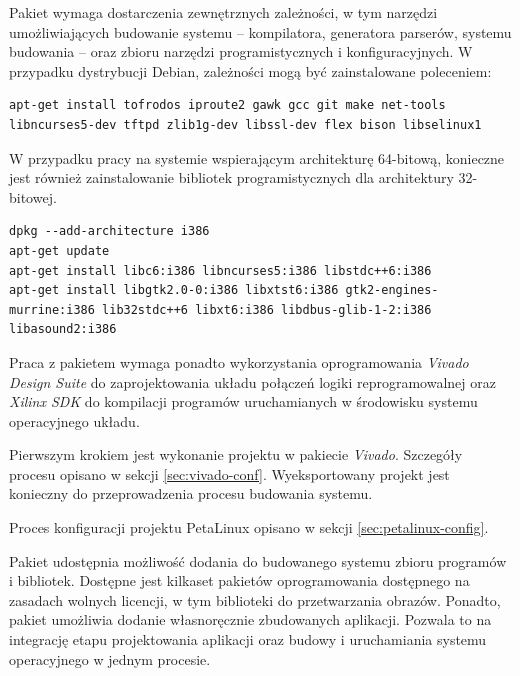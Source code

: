 Pakiet wymaga dostarczenia zewnętrznych zależności, w tym narzędzi umożliwiających budowanie systemu -- kompilatora, generatora parserów, systemu budowania -- oraz zbioru narzędzi programistycznych i konfiguracyjnych.
W przypadku dystrybucji Debian, zależności mogą być zainstalowane poleceniem:

\begin{lstlisting}[breaklines=true]
apt-get install tofrodos iproute2 gawk gcc git make net-tools libncurses5-dev tftpd zlib1g-dev libssl-dev flex bison libselinux1
\end{lstlisting}

W przypadku pracy na systemie wspierającym architekturę 64-bitową, konieczne jest również zainstalowanie bibliotek programistycznych dla architektury 32-bitowej.

\begin{lstlisting}[breaklines=true]
dpkg --add-architecture i386
apt-get update
apt-get install libc6:i386 libncurses5:i386 libstdc++6:i386
apt-get install libgtk2.0-0:i386 libxtst6:i386 gtk2-engines-murrine:i386 lib32stdc++6 libxt6:i386 libdbus-glib-1-2:i386 libasound2:i386
\end{lstlisting}

Praca z pakietem wymaga ponadto wykorzystania oprogramowania \emph{Vivado Design Suite} \cite{vivado-home} do zaprojektowania układu połączeń logiki reprogramowalnej oraz \emph{Xilinx SDK} \cite{xsdk-home} do kompilacji programów uruchamianych w środowisku systemu operacyjnego układu.

Pierwszym krokiem jest wykonanie projektu w pakiecie \emph{Vivado}. 
Szczegóły procesu opisano w sekcji \ref{sec:vivado-conf}. %
Wyeksportowany projekt jest konieczny do przeprowadzenia procesu budowania systemu.

Proces konfiguracji projektu PetaLinux opisano w sekcji \ref{sec:petalinux-config}. %

Pakiet udostępnia możliwość dodania do budowanego systemu zbioru programów i bibliotek. 
Dostępne jest kilkaset pakietów oprogramowania dostępnego na zasadach wolnych licencji, w tym biblioteki do przetwarzania obrazów. %
Ponadto, pakiet umożliwia dodanie własnoręcznie zbudowanych aplikacji. 
Pozwala to na integrację etapu projektowania aplikacji oraz budowy i uruchamiania systemu operacyjnego w jednym procesie.

